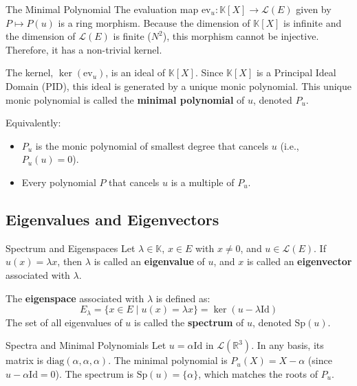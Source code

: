 \documentclass[11pt, a4paper]{article}
\newcommand{\R}{\mathbb{R}}
\begin{document}
\begin{theorem}{The Minimal Polynomial}{}
The evaluation map $\text{ev}_u : \mathbb{K}[X] \to \mathcal{L}(E)$ given by $P \mapsto P(u)$ is a ring morphism. 
Because the dimension of $\mathbb{K}[X]$ is infinite and the dimension of $\mathcal{L}(E)$ is finite ($N^2$), this morphism cannot be injective. 
Therefore, it has a non-trivial kernel. 

The kernel, $\ker(\text{ev}_u)$, is an ideal of $\mathbb{K}[X]$. Since $\mathbb{K}[X]$ is a Principal Ideal Domain (PID), this ideal is generated by a unique monic polynomial. 
This unique monic polynomial is called the \textbf{minimal polynomial} of $u$, denoted $P_u$. 

Equivalently:
\begin{itemize}
    \item $P_u$ is the monic polynomial of smallest degree that cancels $u$ (i.e., $P_u(u) = 0$). 
    \item Every polynomial $P$ that cancels $u$ is a multiple of $P_u$. 
\end{itemize}
\end{theorem}

\subsection{Eigenvalues and Eigenvectors}

\begin{definition}{Spectrum and Eigenspaces}{}
Let $\lambda \in \mathbb{K}$, $x \in E$ with $x \neq 0$, and $u \in \mathcal{L}(E)$. 
If $u(x) = \lambda x$, then $\lambda$ is called an \textbf{eigenvalue} of $u$, and $x$ is called an \textbf{eigenvector} associated with $\lambda$. 

The \textbf{eigenspace} associated with $\lambda$ is defined as:
$$ E_\lambda = \{ x \in E \mid u(x) = \lambda x \} = \ker(u - \lambda \text{Id}) $$ 
The set of all eigenvalues of $u$ is called the \textbf{spectrum} of $u$, denoted $\text{Sp}(u)$. 
\end{definition}

\begin{example}{Spectra and Minimal Polynomials}{}
Let $u = \alpha \text{Id}$ in $\mathcal{L}(\R^3)$. In any basis, its matrix is $\text{diag}(\alpha, \alpha, \alpha)$. 
The minimal polynomial is $P_u(X) = X - \alpha$ (since $u - \alpha \text{Id} = 0$). 
The spectrum is $\text{Sp}(u) = \{\alpha\}$, which matches the roots of $P_u$. 
\end{example}
\end{document}
